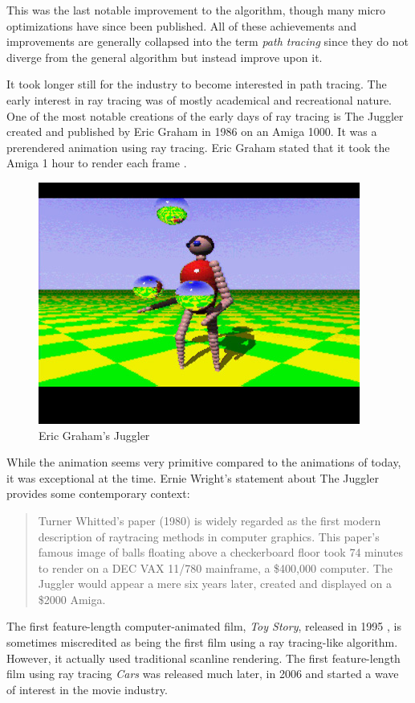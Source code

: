 \documentclass[
  twoside,
  11pt, a4paper,
  footinclude=true,
  headinclude=true,
  cleardoublepage=empty
]{scrreprt}
\begin{document}
This was the last notable improvement to the algorithm,
though many micro optimizations have since been published. All of these achievements and
improvements are generally collapsed into the term \emph{path tracing} since they do not diverge
from the general algorithm but instead improve upon it.

It took longer still for the industry to become interested in path tracing. The early interest in
ray tracing was of mostly academical and recreational nature. One of the most notable creations of
the early days of ray tracing is The Juggler created and published by Eric Graham in 1986
\cite{site:juggler} on an Amiga 1000. It was a prerendered animation using ray tracing. Eric Graham
stated that it took the Amiga 1 hour to render each frame \cite{site:juggler}.

\begin{figure}[H]
    \includegraphics[scale=0.5]{amiga-juggler}
    \centering
    \caption{Eric Graham's Juggler}
    \label{fig:amiga-juggler}
\end{figure}

While the animation seems very primitive compared to the animations of today, it was exceptional at
the time. Ernie Wright's statement about The Juggler provides some contemporary context:
\blockquote[\cite{site:juggler}]{Turner Whitted's paper (1980) is widely regarded as the first modern
description of raytracing methods in computer graphics. This paper's famous image of balls floating
above a checkerboard floor took 74 minutes to render on a DEC VAX 11/780 mainframe, a \$400,000
computer. The Juggler would appear a mere six years later, created and displayed on a \$2000 Amiga.}

The first feature-length computer-animated film,
\textit{Toy Story}, released in 1995 \cite{wiki:toy-story}, is sometimes miscredited as being the
first film using a ray tracing-like algorithm. However, it actually used traditional scanline
rendering. The first feature-length film using ray tracing \textit{Cars} was released much later,
in 2006 \cite{wiki:cars} \cite{inproceedings:cars} and started a wave of interest in the movie industry.
\end{document}
